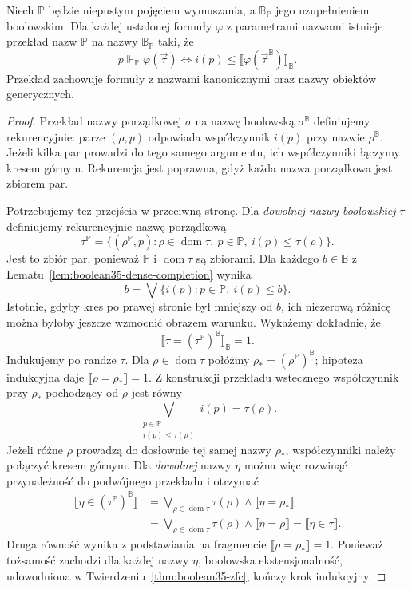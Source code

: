 \begin{lemat}
\label{lem:boolean35-poset-truth}
Niech $\mathbb P$ będzie niepustym
pojęciem wymuszania, a
$\mathbb B_{\mathbb P}$ jego
uzupełnieniem boolowskim.
Dla każdej ustalonej formuły
$\varphi$ z parametrami nazwami
istnieje przekład nazw
$\mathbb P$ na nazwy
$\mathbb B_{\mathbb P}$ taki, że
\[
 p\Vdash_{\mathbb P}\varphi(\vec\tau)
 \iff
 i(p)\le
  \llbracket\varphi(\vec\tau^{\mathbb B})
                   \rrbracket_{\mathbb B}.
\]
Przekład zachowuje formuły
z nazwami kanonicznymi oraz
nazwy obiektów generycznych.
\end{lemat}
\begin{proof}
Przekład nazwy porządkowej
$\sigma$ na nazwę boolowską
$\sigma^{\mathbb B}$ definiujemy
rekurencyjnie: parze $(\rho,p)$
odpowiada współczynnik $i(p)$
przy nazwie $\rho^{\mathbb B}$.
Jeżeli kilka par prowadzi do
tego samego argumentu, ich
współczynniki łączymy kresem
górnym. Rekurencja jest
poprawna, gdyż każda nazwa
porządkowa jest zbiorem par.

Potrzebujemy też przejścia
w przeciwną stronę. Dla
\emph{dowolnej nazwy boolowskiej}
$\tau$ definiujemy rekurencyjnie
nazwę porządkową
\[
 \tau^{\mathbb P}=
 \{(\rho^{\mathbb P},p):
    \rho\in\operatorname{dom}\tau,\
    p\in\mathbb P,\
    i(p)\le\tau(\rho)\}.
\]
Jest to zbiór par, ponieważ
$\mathbb P$ i
$\operatorname{dom}\tau$
są zbiorami. Dla każdego
$b\in\mathbb B$ z
Lematu~\ref{lem:boolean35-dense-completion}
wynika
\[
 b=\bigvee\{i(p):
       p\in\mathbb P,\ i(p)\le b\}.
\]
Istotnie, gdyby kres po
prawej stronie był mniejszy
od $b$, ich niezerową różnicę
można byłoby jeszcze
wzmocnić obrazem warunku.
Wykażemy dokładnie, że
\[
 \llbracket\tau=
      (\tau^{\mathbb P})^{\mathbb B}
       \rrbracket_{\mathbb B}=1.
\]
Indukujemy po randze $\tau$.
Dla $\rho\in\operatorname{dom}\tau$
połóżmy
$\rho_*=(\rho^{\mathbb P})^{\mathbb B}$;
hipoteza indukcyjna daje
$\llbracket\rho=\rho_*\rrbracket=1$.
Z konstrukcji przekładu wstecznego
współczynnik przy $\rho_*$
pochodzący od $\rho$ jest równy
\[
 \bigvee_{\substack{p\in\mathbb P\\
                     i(p)\le\tau(\rho)}}i(p)
 =\tau(\rho).
\]
Jeżeli różne $\rho$ prowadzą
do dosłownie tej samej nazwy
$\rho_*$, współczynniki należy
połączyć kresem górnym.
Dla \emph{dowolnej} nazwy
$\eta$ można więc rozwinąć
przynależność do podwójnego
przekładu i otrzymać
\[
\begin{aligned}
 \llbracket\eta\in
       (\tau^{\mathbb P})^{\mathbb B}
                 \rrbracket
 &=\bigvee_{\rho\in\operatorname{dom}\tau}
    \tau(\rho)\wedge
    \llbracket\eta=\rho_*\rrbracket\\
 &=\bigvee_{\rho\in\operatorname{dom}\tau}
    \tau(\rho)\wedge
    \llbracket\eta=\rho\rrbracket
 =\llbracket\eta\in\tau\rrbracket.
\end{aligned}
\]
Druga równość wynika z
podstawiania na fragmencie
$\llbracket\rho=\rho_*\rrbracket=1$.
Ponieważ tożsamość zachodzi
dla każdej nazwy $\eta$,
boolowska ekstensjonalność,
udowodniona w
Twierdzeniu~\ref{thm:boolean35-zfc},
kończy krok indukcyjny.


\end{proof}
